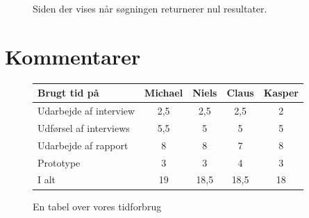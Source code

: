 \documentclass[a4paper, 12pt]{article}
\begin{document}
\begin{figure}[hp]
  \centering
  \caption{Siden der vises når søgningen returnerer nul resultater.}
\end{figure}

\clearpage
\section{Kommentarer}

\begin{figure}[htbp]
  \centering
  \begin{tabular}{l c c c c}
    \toprule
    \textbf{Brugt tid på} & {Michael}   & {Niels} & {Claus} & {Kasper} \\
    \midrule
    Udarbejde af interview  & 2,5  & 2,5  & 2,5  & 2 \\
    Udførsel af interviews  & 5,5  & 5   & 5   & 5 \\
    Udarbejde af rapport    & 8   & 8   & 7   & 8 \\
    Prototype               & 3   & 3   & 4   & 3 \\
    \midrule
    I alt                   & 19  & 18,5 & 18,5 & 18 \\
    \bottomrule
  \end{tabular}
  \caption{En tabel over vores tidforbrug}
  \label{tab:tidsforbrug}
\end{figure}

\printbibliography[heading=bibnumbered,title=Litteraturliste]
\end{document}
